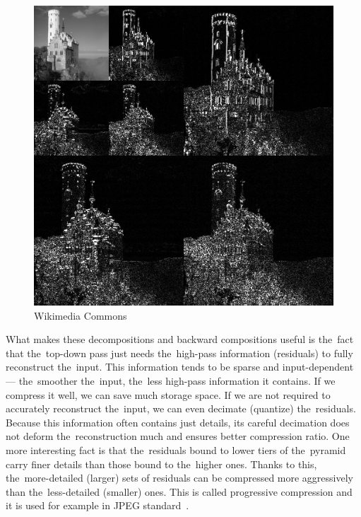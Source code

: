 \begin{figure}
	\includegraphics[width=\textwidth]{figures/wavelet_2d_pyramid.png}\centering
	{Wikimedia Commons~\cite{wavelet_2d_pyramid}}
	\label{fig:wavelet_2d_pyramid}
\end{figure}

What makes these decompositions and backward compositions useful is the~fact that the~top-down pass just needs the~high-pass information (residuals) to fully reconstruct the~input. This information tends to be sparse and input-dependent --- the~smoother the~input, the~less high-pass information it contains. If we compress it well, we can save much storage space. If we are not required to accurately reconstruct the~input, we can even decimate (quantize) the~residuals. Because this information often contains just details, its careful decimation does not deform the~reconstruction much and ensures better compression ratio. One more interesting fact is that the~residuals bound to lower tiers of the~pyramid carry finer details than those bound to the~higher ones. Thanks to this, the~more-detailed (larger) sets of residuals can be compressed more aggressively than the~less-detailed (smaller) ones. This is called progressive compression and it is used for example in JPEG standard~\cite{jpeg}.


